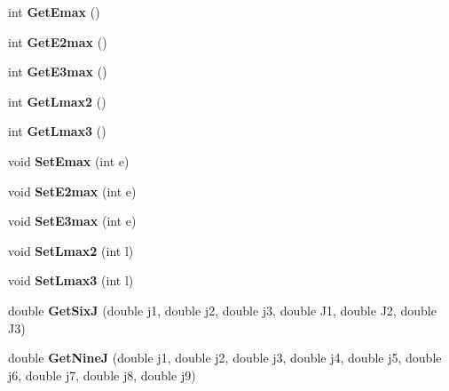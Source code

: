 \begin{DoxyCompactItemize}
\mbox{\label{classModelSpace_a68589449fbb7240d68877fcdc133a1d7}} 
int {\bfseries Get\+Emax} ()
\item 
\mbox{\label{classModelSpace_ad5289ea77c79b0ce4d9a9824374cad04}} 
int {\bfseries Get\+E2max} ()
\item 
\mbox{\label{classModelSpace_a43b38395bba0af89b60a24dbe1323a07}} 
int {\bfseries Get\+E3max} ()
\item 
\mbox{\label{classModelSpace_a876da946190e1a04ed1f72a2097f93ac}} 
int {\bfseries Get\+Lmax2} ()
\item 
\mbox{\label{classModelSpace_a3ec5612a3064eac5bafbf0b2709c5cc0}} 
int {\bfseries Get\+Lmax3} ()
\item 
\mbox{\label{classModelSpace_ad28541b219257d967a299046e6b6e9e5}} 
void {\bfseries Set\+Emax} (int e)
\item 
\mbox{\label{classModelSpace_ad970185c03f12be950c4ca3903370a64}} 
void {\bfseries Set\+E2max} (int e)
\item 
\mbox{\label{classModelSpace_ae46d0574068271181e382122289c8e61}} 
void {\bfseries Set\+E3max} (int e)
\item 
\mbox{\label{classModelSpace_a847073aa2793e18799ddb36e6a7c32a7}} 
void {\bfseries Set\+Lmax2} (int l)
\item 
\mbox{\label{classModelSpace_a426ef832829aef84c3c74fa5a0b28f29}} 
void {\bfseries Set\+Lmax3} (int l)
\item 
\mbox{\label{classModelSpace_a716c2bf4a6b42c1c27579b0b7804252e}} 
double {\bfseries Get\+SixJ} (double j1, double j2, double j3, double J1, double J2, double J3)
\item 
\mbox{\label{classModelSpace_ab9303a5a0cc4513bf4ed4430d9fe86a6}} 
double {\bfseries Get\+NineJ} (double j1, double j2, double j3, double j4, double j5, double j6, double j7, double j8, double j9)

\end{DoxyCompactItemize}
